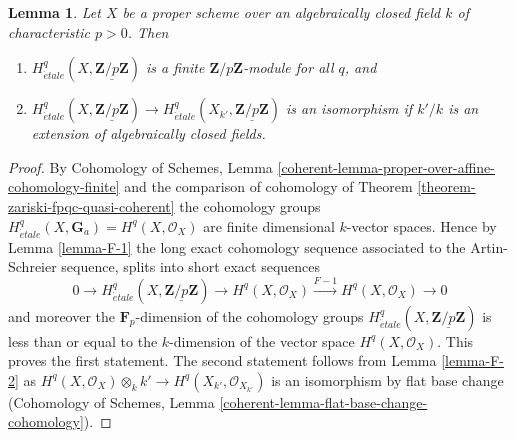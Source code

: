 \documentclass[10pt,a4paper]{amsart}
\theoremstyle{plain}
\newtheorem{lemma}[subsection]{Lemma}
\theoremstyle{definition}
\theoremstyle{remark}
\numberwithin{equation}{subsection}
\def\etale{{\acute{e}tale}}
\begin{document}
\begin{lemma}
\label{lemma-finiteness-proper-variety-char-p-p}
Let $X$ be a proper scheme over an algebraically closed
field $k$ of characteristic $p > 0$. Then
\begin{enumerate}
\item $H_\etale^q(X, \underline{\mathbf{Z}/p\mathbf{Z}})$
is a finite $\mathbf{Z}/p\mathbf{Z}$-module for all $q$, and
\item $H^q_\etale(X, \underline{\mathbf{Z}/p\mathbf{Z}}) \to
H^q_\etale(X_{k'}, \underline{\mathbf{Z}/p\mathbf{Z}})$
is an isomorphism if $k'/k$ is an extension of algebraically
closed fields.
\end{enumerate}
\end{lemma}

\begin{proof}
By Cohomology of Schemes, Lemma
\ref{coherent-lemma-proper-over-affine-cohomology-finite}
and the comparison of cohomology of
Theorem \ref{theorem-zariski-fpqc-quasi-coherent} the cohomology groups
$H^q_\etale(X, \mathbf{G}_a) = H^q(X, \mathcal{O}_X)$ are
finite dimensional $k$-vector spaces. Hence by
Lemma \ref{lemma-F-1} the long exact cohomology sequence
associated to the Artin-Schreier sequence, splits into
short exact sequences
$$
0 \to H_\etale^q(X, \underline{\mathbf{Z}/p\mathbf{Z}}) \to
H^q(X, \mathcal{O}_X) \xrightarrow{F - 1} H^q(X, \mathcal{O}_X) \to 0
$$
and moreover the $\mathbf{F}_p$-dimension of the cohomology groups
$H_\etale^q(X, \underline{\mathbf{Z}/p\mathbf{Z}})$ is less than or equal to the
$k$-dimension of the vector space $H^q(X, \mathcal{O}_X)$.
This proves the first statement. The second statement follows
from Lemma \ref{lemma-F-2}
as $H^q(X, \mathcal{O}_X) \otimes_k k' \to H^q(X_{k'}, \mathcal{O}_{X_{k'}})$
is an isomorphism by flat base change
(Cohomology of Schemes,
Lemma \ref{coherent-lemma-flat-base-change-cohomology}).
\end{proof}
\end{document}
